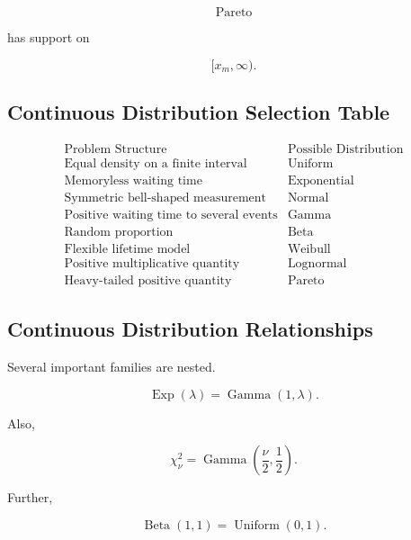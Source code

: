\[
\operatorname{Pareto}
\]

has support on

\[
[x_m,\infty).
\]

\subsection{Continuous Distribution Selection Table}
\label{subsec:continuous-distribution-selection-table}

\[
\begin{array}{c|c}
\text{Problem Structure}
&
\text{Possible Distribution}
\\
\hline
\text{Equal density on a finite interval}
&
\operatorname{Uniform}
\\[1mm]
\text{Memoryless waiting time}
&
\operatorname{Exponential}
\\[1mm]
\text{Symmetric bell-shaped measurement}
&
\operatorname{Normal}
\\[1mm]
\text{Positive waiting time to several events}
&
\operatorname{Gamma}
\\[1mm]
\text{Random proportion}
&
\operatorname{Beta}
\\[1mm]
\text{Flexible lifetime model}
&
\operatorname{Weibull}
\\[1mm]
\text{Positive multiplicative quantity}
&
\operatorname{Lognormal}
\\[1mm]
\text{Heavy-tailed positive quantity}
&
\operatorname{Pareto}
\end{array}
\]

\subsection{Continuous Distribution Relationships}
\label{subsec:continuous-distribution-relationships}

Several important families are nested.

\[
\boxed{
\operatorname{Exp}(\lambda)
=
\operatorname{Gamma}(1,\lambda).
}
\]

Also,

\[
\boxed{
\chi^2_\nu
=
\operatorname{Gamma}
\left(
\frac{\nu}{2},
\frac12
\right).
}
\]

Further,

\[
\boxed{
\operatorname{Beta}(1,1)
=
\operatorname{Uniform}(0,1).
}
\]

